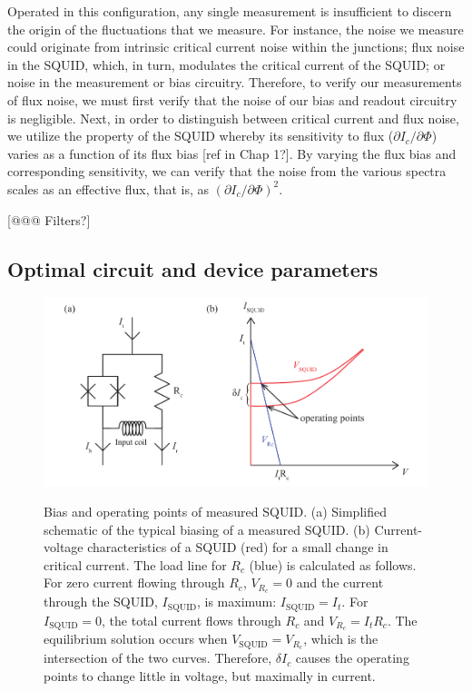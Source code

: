 Operated in this configuration, any single measurement is insufficient to discern the origin of the fluctuations that we measure. For instance, the noise we measure could originate from intrinsic critical current noise within the junctions; flux noise in the SQUID, which, in turn, modulates the critical current of the SQUID; or noise in the measurement or bias circuitry. Therefore, to verify our measurements of flux noise, we must first verify that the noise of our bias and readout circuitry is negligible. Next, in order to distinguish between critical current and flux noise, we utilize the property of the SQUID whereby its sensitivity to flux ($\partial I_c/\partial\Phi$) varies as a function of its flux bias [ref in Chap 1?]. By varying the flux bias and corresponding sensitivity, we can verify that the noise from the various spectra scales as an effective flux, that is, as $(\partial I_c/\partial\Phi)^2$.

[@@@ Filters?]

\subsection{Optimal circuit and device parameters}

\begin{figure}
\centering\includegraphics{experimental/Fig_loadline}\\
\caption[Bias and operating points of measured SQUID]{Bias and operating points of measured SQUID. (a) Simplified schematic of the typical biasing of a measured SQUID. (b) Current-voltage characteristics of a SQUID (red) for a small change in critical current. The load line for $R_c$ (blue) is calculated as follows. For zero current flowing through $R_c$, $V_{R_c} = 0$ and the current through the SQUID, $I_{\text{SQUID}}$, is maximum: $I_{\text{SQUID}} = I_t$. For $I_{\text{SQUID}} = 0$, the total current flows through $R_c$ and $V_{R_c} = I_t R_c$. The equilibrium solution occurs when $V_{\text{SQUID}} = V_{R_c}$, which is the intersection of the two curves. Therefore, $\delta I_c$ causes the operating points to change little in voltage, but maximally in current.}
\label{fig:experimental:loadline}
\end{figure}

